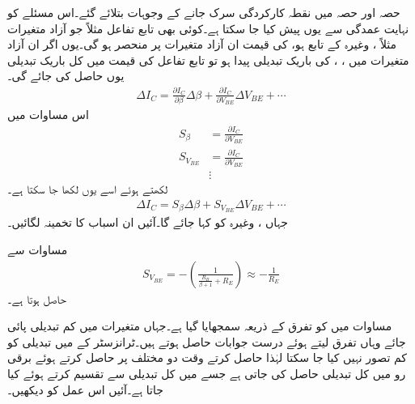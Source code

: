 حصہ   اور حصہ   میں نقطہ کارکردگی سرک جانے کے وجوہات بتلائے گئے۔اس مسئلے کو نہایت عمدگی سے یوں پیش کیا جا سکتا ہے۔کوئی بھی تابع تفاعل مثلاً   جو آزاد متغیرات مثلاً ،  وغیرہ کے تابع ہو، کی قیمت ان آزاد متغیرات پر منحصر ہو گی۔یوں اگر ان آزاد متغیرات میں ، ،  کی باریک تبدیلی پیدا ہو تو تابع تفاعل کی قیمت میں کل باریک تبدیلی یوں حاصل کی جائے گی۔
\begin{align}
\Delta I_C=\frac{\partial I_C}{\partial \beta} \Delta \beta +\frac{\partial I_C}{ \partial V_{BE}} \Delta V_{BE} +\cdots
\end{align}
اس مساوات میں
\begin{align} \label{مساوات_ٹرانزسٹر_سوارنے_اسباب_الف}
S_{\beta}&=\frac{\partial I_C}{\partial V_{BE}}\\
S_{V_{BE}}&=\frac{\partial I_C}{\partial V_{BE}}\\
&\vdots \nonumber
\end{align}
لکھتے ہوئے اسے یوں لکھا جا سکتا ہے۔
\begin{align} \label{مساوات_ٹرانزسٹر_اسباب_تفرق_مساوات}
\Delta I_C = S_{\beta} \Delta \beta+S_{V_{BE}} \Delta V_{BE} +\cdots
\end{align}
جہاں  ،  وغیرہ کو   کہا جائے گا۔آئیں ان اسباب کا تخمینہ لگائیں۔

مساوات   سے 
\begin{align}\label{مساوات_ٹرانزسٹر_قابو_دباو_اسباب}
S_{V_{BE}}=-\left ( \frac{1}{\frac{R_B}{\beta+1}+R_E} \right ) \approx -\frac{1}{R_E}
\end{align}
حاصل ہوتا ہے۔

مساوات  میں  کو تفرق کے ذریعہ سمجھایا گیا ہے۔جہاں متغیرات میں کم تبدیلی پائی جائے وہاں تفرق لیتے ہوئے درست جوابات حاصل ہوتے ہیں۔ٹرانزسٹر کے  میں تبدیلی کو کم تصور نہیں کیا جا سکتا لہٰذا  حاصل کرتے وقت دو مختلف  پر  حاصل کرتے ہوئے برقی رو میں کل تبدیلی  حاصل کی جاتی ہے جسے  میں کل تبدیلی  سے تقسیم کرتے ہوئے   کیا جاتا ہے۔آئیں اس عمل کو دیکھیں۔

